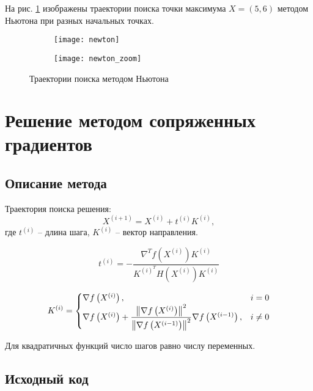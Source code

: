 На рис. \ref{fig:newton} изображены траектории поиска точки максимума $X = (5, 6)$ методом Ньютона при разных начальных точках.
\begin{figure}[H]
\begin{center}
	\begin{subfigure}[b]{0.49\textwidth}
		\texttt{[image: newton]}
	\end{subfigure}
	\begin{subfigure}[b]{0.49\textwidth}
		\texttt{[image: newton\_zoom]}
	\end{subfigure}
	\caption{Траектории поиска методом Ньютона}
	\label{fig:newton}
\end{center}
\end{figure}

\section{Решение методом сопряженных градиентов}

\subsection{Описание метода}

Траектория поиска решения:
\begin{equation*}
X^{(i+1)}  = X^{(i)} + t^{(i)} K^{(i)},
\end{equation*}
где $t^{(i)}$ -- длина шага, $K^{(i)}$ -- вектор направления.

\begin{equation*}
t^{(i)} = -\dfrac{\nabla^T f\left(X^{(i)}\right) K^{(i)}}{K^{(i)^T} H\left(X^{(i)}\right) K^{(i)}}
\end{equation*}

\begin{equation*}
K^{(i)} = 
\begin{cases}
\nabla f\left(X^{(i)}\right), &i = 0\\
\nabla f\left(X^{(i)}\right) + \dfrac{\left\lVert\nabla f\left(X^{(i)}\right)\right\rVert^2}{\left\lVert\nabla f\left(X^{(i-1)}\right)\right\rVert^2} \nabla f\left(X^{(i-1)}\right), &i \neq 0
\end{cases}
\end{equation*}

Для квадратичных функций число шагов равно числу переменных.

\subsection{Исходный код}

